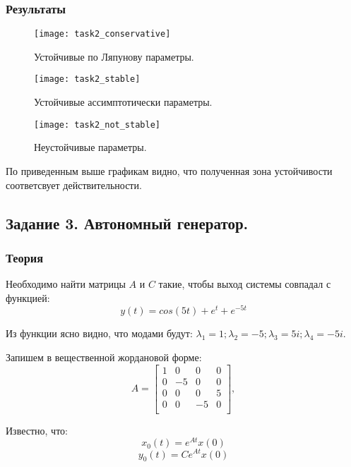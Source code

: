 \documentclass[16pt]{article}
\begin{document}
\subsubsection{Результаты}
\begin{figure}[h]
	\centering
	\texttt{[image: task2\_conservative]}
	\caption{Устойчивые по Ляпунову параметры.}
	\label{fig:fig5}
\end{figure}
\begin{figure}[H]
	\centering
	\texttt{[image: task2\_stable]}
	\caption{Устойчивые ассимптотически параметры.}
	\label{fig:fig6}
\end{figure}
\begin{figure}[H]
	\centering
	\texttt{[image: task2\_not\_stable]}
	\caption{Неустойчивые параметры.}
	\label{fig:fig7}
\end{figure}
По приведенным выше графикам видно, что полученная зона устойчивости соответсвует действительности.
\newpage
\subsection{Задание 3. Автономный генератор.}
\subsubsection{Теория}
Необходимо найти матрицы \(A\) и \(C\) такие, чтобы выход системы совпадал с функцией:
\[y(t) = cos(5t) + e^t + e^{-5t}\]

Из функции ясно видно, что модами будут:
\(\lambda_1 = 1; \lambda_2 = -5; \lambda_3 = 5i; \lambda_4 = -5i.\)

Запишем в вещественной жордановой форме:
\[
    A = \begin{bmatrix}
    1 & 0 & 0 & 0 \\
    0 & -5 & 0 & 0 \\
    0 & 0 & 0 & 5 \\
    0 & 0 & -5 & 0 \\
    \end{bmatrix},
\]

Известно, что:
\[ x_0(t) = e^{At}x(0)  \]
\[ y_0(t) = Ce^{At}x(0) \]
\end{document}

